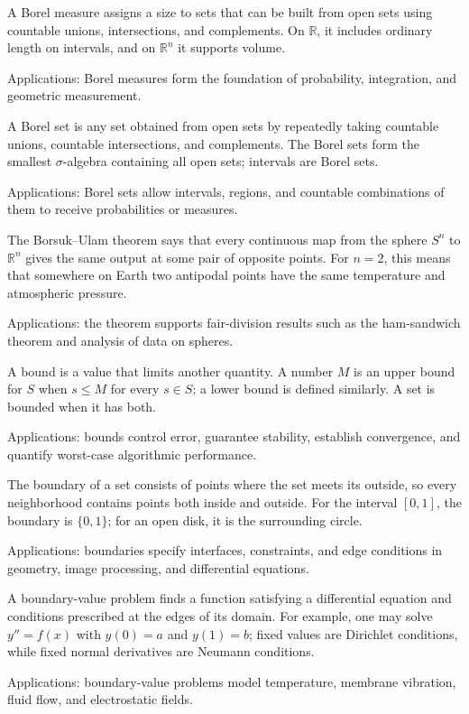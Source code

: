 A Borel measure assigns a size to sets that can be built from open sets using countable unions, intersections, and complements. On $\mathbb R$, it includes ordinary length on intervals, and on $\mathbb R^n$ it supports volume. \par\noindent Applications: Borel measures form the foundation of probability, integration, and geometric measurement.

A Borel set is any set obtained from open sets by repeatedly taking countable unions, countable intersections, and complements. The Borel sets form the smallest $\sigma$-algebra containing all open sets; intervals are Borel sets. \par\noindent Applications: Borel sets allow intervals, regions, and countable combinations of them to receive probabilities or measures.

The Borsuk--Ulam theorem says that every continuous map from the sphere $S^n$ to $\mathbb R^n$ gives the same output at some pair of opposite points. For $n=2$, this means that somewhere on Earth two antipodal points have the same temperature and atmospheric pressure. \par\noindent Applications: the theorem supports fair-division results such as the ham-sandwich theorem and analysis of data on spheres.

A bound is a value that limits another quantity. A number $M$ is an upper bound for $S$ when $s\le M$ for every $s\in S$; a lower bound is defined similarly. A set is bounded when it has both. \par\noindent Applications: bounds control error, guarantee stability, establish convergence, and quantify worst-case algorithmic performance.

The boundary of a set consists of points where the set meets its outside, so every neighborhood contains points both inside and outside. For the interval $[0,1]$, the boundary is $\{0,1\}$; for an open disk, it is the surrounding circle. \par\noindent Applications: boundaries specify interfaces, constraints, and edge conditions in geometry, image processing, and differential equations.

A boundary-value problem finds a function satisfying a differential equation and conditions prescribed at the edges of its domain. For example, one may solve $y''=f(x)$ with $y(0)=a$ and $y(1)=b$; fixed values are Dirichlet conditions, while fixed normal derivatives are Neumann conditions. \par\noindent Applications: boundary-value problems model temperature, membrane vibration, fluid flow, and electrostatic fields.

